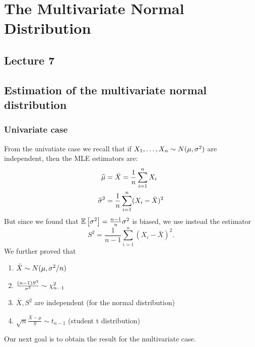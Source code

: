 \section{The Multivariate Normal Distribution}
\subsection*{Lecture 7}

\subsection{Estimation of the multivariate normal distribution}
\subsubsection{Univariate case}
From the univatiate case we recall that if $X_1,\dots,X_n \sim N(\mu, {\sigma^2})$ are independent, then the MLE estimators are:
\begin{align*}
    \widehat{\mu} &= \bar{X} = \frac{1}{n} \sum_{i=1}^n X_i \\
    \widehat{\sigma}^2 &= \frac{1}{n} \sum_{i=1}^n (X_i-\bar{X})^2
\end{align*}
But since we found that $\mathbb{E}\left[\sigma^2\right]=\frac{n-1}{n} \sigma^2$ is biased, we use instead the estimator
$$
    S^2 = \frac{1}{n-1} \sum_{i=1}^n (X_i-\bar{X})^2.
$$
We further proved that
\begin{enumerate}
    \item $\bar{X} \sim N(\mu, \sigma^2/n)$
    \item $\frac{(n-1)S^2}{\sigma^2} \sim \chi^2_{n-1}$
    \item $\bar{X}, S^2$ are independent (for the normal distribution)
    \item $\sqrt{n} \frac{\bar{X}-\mu}{S} \sim t_{n-1}$ (student t distribution)
\end{enumerate}
Our next goal is to obtain the result for the multivariate case. 
